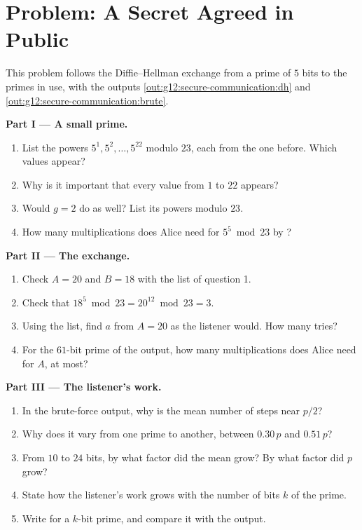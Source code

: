 \section{Problem: A Secret Agreed in Public}\label{sec:g12:secure-communication:problem}

\begin{problem}\label{pb:g12:secure-communication:1}
This problem follows the Diffie--Hellman exchange from a prime of $5$ bits to the primes in use, with the outputs
\ref{out:g12:secure-communication:dh} and \ref{out:g12:secure-communication:brute}.

\medskip\noindent\textbf{Part I --- A small prime.}
\begin{enumerate}
  \item List the powers $5^1, 5^2, \dots, 5^{22}$ modulo $23$, each from the one before. Which values appear?
  \item Why is it important that every value from $1$ to $22$ appears?
  \item Would $g = 2$ do as well? List its powers modulo $23$.
  \item How many multiplications does Alice need for $5^5 \bmod 23$ by ?
\end{enumerate}

\medskip\noindent\textbf{Part II --- The exchange.}
\begin{enumerate}[resume]
  \item Check $A = 20$ and $B = 18$ with the list of question 1.
  \item Check that $18^5 \bmod 23 = 20^{12} \bmod 23 = 3$.
  \item Using the list, find $a$ from $A = 20$ as the listener would. How many tries?
  \item For the $61$-bit prime of the output, how many multiplications does Alice need for $A$, at most?
\end{enumerate}

\medskip\noindent\textbf{Part III --- The listener's work.}
\begin{enumerate}[resume]
  \item In the brute-force output, why is the mean number of steps near $p/2$?
  \item Why does it vary from one prime to another, between $0.30\,p$ and $0.51\,p$?
  \item From $10$ to $24$ bits, by what factor did the mean grow? By what factor did $p$ grow?
  \item State how the listener's work grows with the number of bits $k$ of the prime.
  \item Write  for a $k$-bit prime, and compare it with the output.
\end{enumerate}


\end{problem}
